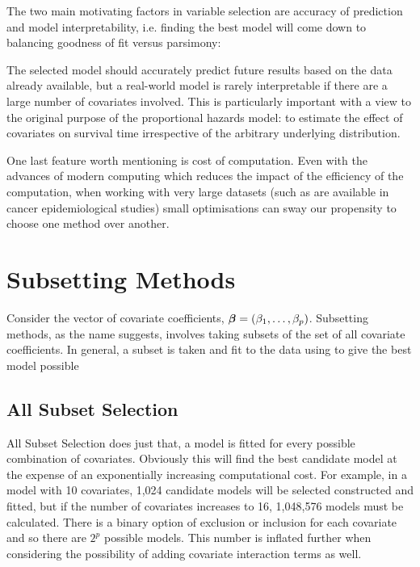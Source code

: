 The two main motivating factors in variable selection are accuracy of prediction and model interpretability, i.e. finding the best model will come down to balancing goodness of fit versus parsimony:

The selected model should accurately predict future results based on the data already available, but a real-world model is rarely interpretable if there are a large number of covariates involved. This is particularly important with a view to the original purpose of the proportional hazards model: to estimate the effect of covariates on survival time irrespective of the arbitrary underlying distribution. 

One last feature worth mentioning is cost of computation. Even with the advances of modern computing which reduces the impact of the efficiency of the computation, when working with very large datasets (such as are available in cancer epidemiological studies) small optimisations can sway our propensity to choose one method over another.

\section{Subsetting Methods}

Consider the vector of covariate coefficients, $\boldsymbol{\beta}=(\beta_1, \ldots, \beta_p)$. Subsetting methods, as the name suggests, involves taking subsets of the set of all covariate coefficients. In general, a subset is taken and fit to the data using to give the best model possible


\subsection{All Subset Selection}

All Subset Selection does just that, a model is fitted for every possible combination of covariates. Obviously this will find the best candidate model at the expense of an exponentially increasing computational cost. For example, in a model with 10 covariates, 1,024 candidate models will be selected constructed and fitted, but if the number of covariates increases to 16, 1,048,576 models must be calculated. There is a binary option of exclusion or inclusion for each covariate and so there are $2^p$ possible models. This number is inflated further when considering the possibility of adding covariate interaction terms as well.

